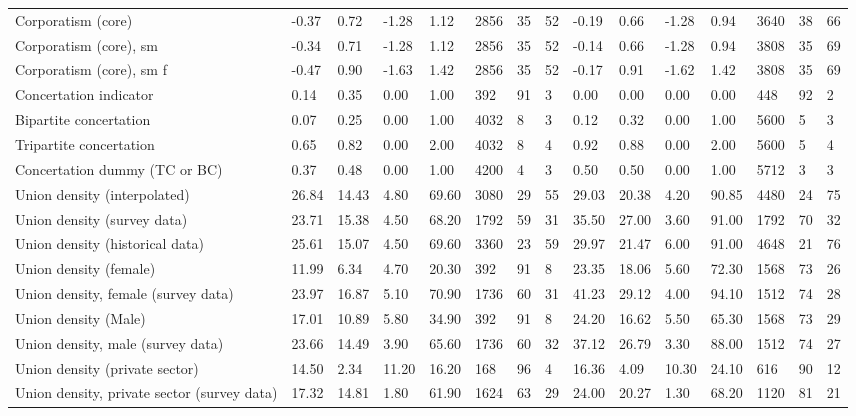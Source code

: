 \begin{longtable}{lllllllllllllll}
Corporatism (core) & -0.37 & 0.72 & -1.28 & 1.12 & 2856 & 35 & 52 & -0.19 & 0.66 & -1.28 & 0.94 & 3640 & 38 & 66\\
\addlinespace
Corporatism (core), sm & -0.34 & 0.71 & -1.28 & 1.12 & 2856 & 35 & 52 & -0.14 & 0.66 & -1.28 & 0.94 & 3808 & 35 & 69\\
Corporatism (core), sm f & -0.47 & 0.90 & -1.63 & 1.42 & 2856 & 35 & 52 & -0.17 & 0.91 & -1.62 & 1.42 & 3808 & 35 & 69\\
Concertation indicator & 0.14 & 0.35 & 0.00 & 1.00 & 392 & 91 & 3 & 0.00 & 0.00 & 0.00 & 0.00 & 448 & 92 & 2\\
Bipartite concertation & 0.07 & 0.25 & 0.00 & 1.00 & 4032 & 8 & 3 & 0.12 & 0.32 & 0.00 & 1.00 & 5600 & 5 & 3\\
Tripartite concertation & 0.65 & 0.82 & 0.00 & 2.00 & 4032 & 8 & 4 & 0.92 & 0.88 & 0.00 & 2.00 & 5600 & 5 & 4\\
\addlinespace
Concertation dummy (TC or BC) & 0.37 & 0.48 & 0.00 & 1.00 & 4200 & 4 & 3 & 0.50 & 0.50 & 0.00 & 1.00 & 5712 & 3 & 3\\
Union density (interpolated) & 26.84 & 14.43 & 4.80 & 69.60 & 3080 & 29 & 55 & 29.03 & 20.38 & 4.20 & 90.85 & 4480 & 24 & 75\\
Union density (survey data) & 23.71 & 15.38 & 4.50 & 68.20 & 1792 & 59 & 31 & 35.50 & 27.00 & 3.60 & 91.00 & 1792 & 70 & 32\\
Union density (historical data) & 25.61 & 15.07 & 4.50 & 69.60 & 3360 & 23 & 59 & 29.97 & 21.47 & 6.00 & 91.00 & 4648 & 21 & 76\\
Union density (female) & 11.99 & 6.34 & 4.70 & 20.30 & 392 & 91 & 8 & 23.35 & 18.06 & 5.60 & 72.30 & 1568 & 73 & 26\\
\addlinespace
Union density, female (survey data) & 23.97 & 16.87 & 5.10 & 70.90 & 1736 & 60 & 31 & 41.23 & 29.12 & 4.00 & 94.10 & 1512 & 74 & 28\\
Union density (Male) & 17.01 & 10.89 & 5.80 & 34.90 & 392 & 91 & 8 & 24.20 & 16.62 & 5.50 & 65.30 & 1568 & 73 & 29\\
Union density, male (survey data) & 23.66 & 14.49 & 3.90 & 65.60 & 1736 & 60 & 32 & 37.12 & 26.79 & 3.30 & 88.00 & 1512 & 74 & 27\\
Union density (private sector) & 14.50 & 2.34 & 11.20 & 16.20 & 168 & 96 & 4 & 16.36 & 4.09 & 10.30 & 24.10 & 616 & 90 & 12\\
Union density, private sector (survey data) & 17.32 & 14.81 & 1.80 & 61.90 & 1624 & 63 & 29 & 24.00 & 20.27 & 1.30 & 68.20 & 1120 & 81 & 21\\

\end{longtable}
